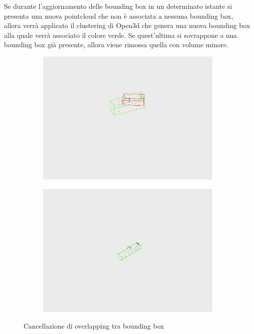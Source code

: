 \documentclass[italian]{article}
\begin{document}
Se durante l'aggiornamento delle bounding box in un determinato istante si presenta una nuova pointcloud che non è associata a nessuna bounding box, allora verrà applicato il clustering di Open3d che genera una nuova bounding box alla quale verrà associato il colore verde. Se quest'ultima si sovrappone a una bounding box già presente, allora viene rimossa quella con volume minore.\\
\begin{figure}[H]
	\centering
	\begin{subfigure}{0.45\textwidth}
		\includegraphics[width=\textwidth]{overlap_remove_1}
	\end{subfigure}
	\begin{subfigure}{0.45\textwidth}
		\includegraphics[width=\textwidth]{overlap_remove_2}
	\end{subfigure}
	\footnotesize
	\caption{Cancellazione di overlapping tra bounding box}
\end{figure}
\end{document}

